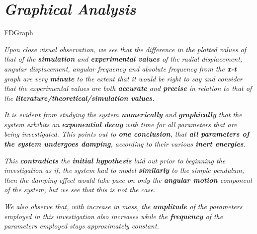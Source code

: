 \section{\textit{Graphical Analysis}}
            
	{FDGraph}
            
    \textit{Upon close visual observation, we see that the difference in the plotted values of that of the \textbf{simulation} and \textbf{experimental values} of the radial displacement, angular displacement, angular frequency and absolute frequency from the \textbf{x-t} graph are very \textbf{minute} to the extent that it would be right to say and consider that the experimental values are both \textbf{accurate} and \textbf{precise} in relation to that of the \textbf{literature/theoretical/simulation values}.}
        
	\textit{It is evident from studying the system \textbf{numerically} and \textbf{graphically} that the system exhibits an \textbf{exponential decay} with time for all parameters that are being investigated. This points out to \textbf{one conclusion}, that \textbf{all parameters of the system undergoes damping}, according to their various \textbf{inert energies}.}
	 
	\textit{This \textbf{contradicts} the \textbf{initial hypothesis} laid out prior to beginning the investigation as if, the system had to model \textbf{similarly} to the simple pendulum, then the damping effect would take pace on only the \textbf{angular motion} component of the system, but we see that this is not the case.}        
        
    \textit{We also observe that, with increase in mass, the \textbf{amplitude} of the parameters employed in this investigation also increases while the \textbf{frequency} of the parameters employed stays approximately constant.}
        
    
    

